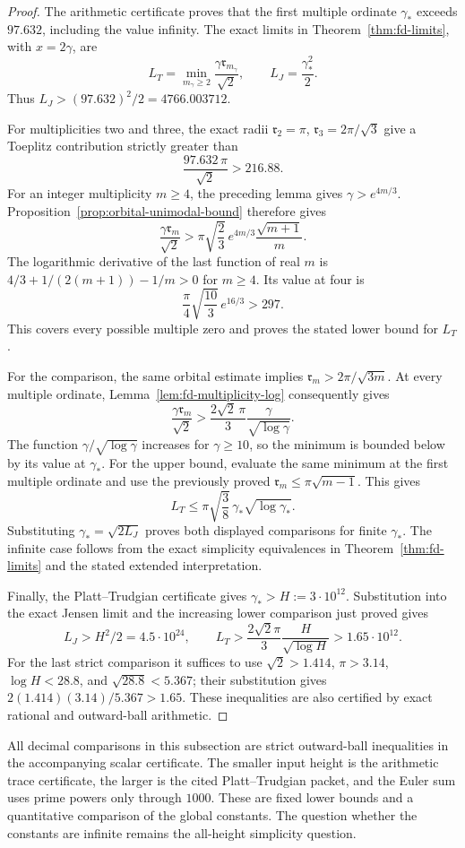 \begin{proof}
The arithmetic certificate proves that the first multiple ordinate
\(\gamma_*\) exceeds \(97.632\), including the value infinity.
The exact limits in Theorem~\ref{thm:fd-limits}, with \(x=2\gamma\),
are
\[
 L_T=\min_{m_\gamma\ge2}\frac{\gamma\mathfrak r_{m_\gamma}}{\sqrt2},
 \qquad L_J=\frac{\gamma_*^2}{2}.
\]
Thus \(L_J>(97.632)^2/2=4766.003712\).

For multiplicities two and three, the exact radii
\(\mathfrak r_2=\pi\), \(\mathfrak r_3=2\pi/\sqrt3\) give a
Toeplitz contribution strictly greater than
\[
 \frac{97.632\,\pi}{\sqrt2}>216.88.
\]
For an integer multiplicity \(m\ge4\), the preceding lemma gives
\(\gamma>e^{4m/3}\). Proposition~\ref{prop:orbital-unimodal-bound}
therefore gives
\[
 \frac{\gamma\mathfrak r_m}{\sqrt2}
 >\pi\sqrt{\frac23}\,e^{4m/3}\frac{\sqrt{m+1}}m.
\]
The logarithmic derivative of the last function of real \(m\) is
\(4/3+1/(2(m+1))-1/m>0\) for \(m\ge4\). Its value at four is
\[
 \frac\pi4\sqrt{\frac{10}3}\,e^{16/3}>297.
\]
This covers every possible multiple zero and proves the stated
lower bound for \(L_T\).

For the comparison, the same orbital estimate implies
\(\mathfrak r_m>2\pi/\sqrt{3m}\). At every multiple ordinate,
Lemma~\ref{lem:fd-multiplicity-log} consequently gives
\[
 \frac{\gamma\mathfrak r_m}{\sqrt2}
 >\frac{2\sqrt2\,\pi}{3}
             \frac{\gamma}{\sqrt{\log\gamma}}.
\]
The function \(\gamma/\sqrt{\log\gamma}\) increases for
\(\gamma\ge10\), so the minimum is bounded below by its value
at \(\gamma_*\). For the upper bound, evaluate the same minimum
at the first multiple ordinate and use the previously proved
\(\mathfrak r_m\le\pi\sqrt{m-1}\). This gives
\[
 L_T\le\pi\sqrt{\frac38}\,
          \gamma_*\sqrt{\log\gamma_*}.
\]
Substituting \(\gamma_*=\sqrt{2L_J}\) proves both displayed
comparisons for finite \(\gamma_*\). The infinite case follows
from the exact simplicity equivalences in
Theorem~\ref{thm:fd-limits} and the stated extended interpretation.

Finally, the Platt--Trudgian certificate gives
\(\gamma_*>H:=3\cdot10^{12}\). Substitution into the exact
Jensen limit and the increasing lower comparison just proved gives
\[
 L_J>H^2/2=4.5\cdot10^{24},\qquad
 L_T>\frac{2\sqrt2\pi}{3}\frac{H}{\sqrt{\log H}}
                         >1.65\cdot10^{12}.
\]
For the last strict comparison it suffices to use
\(\sqrt2>1.414\), \(\pi>3.14\), \(\log H<28.8\), and
\(\sqrt{28.8}<5.367\); their substitution gives
\(2(1.414)(3.14)/5.367>1.65\). These inequalities are also
certified by exact rational and outward-ball arithmetic.
\end{proof}

All decimal comparisons in this subsection are strict outward-ball
inequalities in the accompanying scalar certificate. The smaller input height
is the arithmetic trace certificate, the larger is the cited
Platt--Trudgian packet, and the Euler sum
uses prime powers only through \(1000\). These are fixed lower bounds
and a quantitative comparison of the global constants. The question
whether the constants are infinite remains the all-height simplicity
question.
